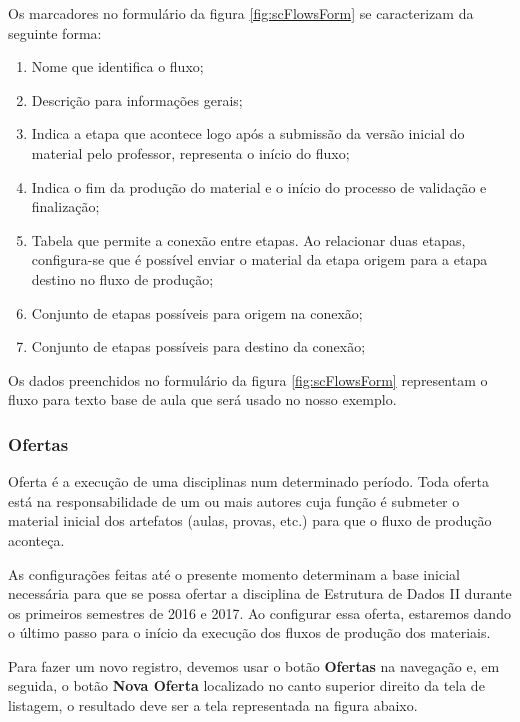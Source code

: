 Os marcadores no formulário da figura \hyperref[fig:scFlowsForm]{\ref{fig:scFlowsForm}} se caracterizam da seguinte forma:

\begin{enumerate}
	\item Nome que identifica o fluxo;
	\item Descrição para informações gerais;
	\item Indica a etapa que acontece logo após a submissão da versão inicial do material pelo professor, representa o início do fluxo;
	\item Indica o fim da produção do material e o início do processo de validação e finalização;
	\item Tabela que permite a conexão entre etapas. Ao relacionar duas etapas, configura-se que é possível enviar o material da etapa origem para a etapa destino no fluxo de produção;
	\item Conjunto de etapas possíveis para origem na conexão;
	\item Conjunto de etapas possíveis para destino da conexão;
\end{enumerate}

Os dados preenchidos no formulário da figura \hyperref[fig:scFlowsForm]{\ref{fig:scFlowsForm}} representam o fluxo para texto base de aula que será usado no nosso exemplo.

\subsubsection{Ofertas}

Oferta é a execução de uma disciplinas num determinado período. Toda oferta está na responsabilidade de um ou mais autores cuja função é submeter o material inicial dos artefatos (aulas, provas, etc.) para que o fluxo de  produção aconteça.

As configurações feitas até o presente momento determinam a base inicial necessária para que se possa ofertar a disciplina de Estrutura de Dados II durante os primeiros semestres de 2016 e 2017. Ao configurar essa oferta, estaremos dando o último passo para o início da execução dos fluxos de produção dos materiais.

Para fazer um novo registro, devemos usar o botão \textbf{Ofertas} na navegação e, em seguida, o botão \textbf{Nova Oferta} localizado no canto superior direito da tela de listagem, o resultado deve ser a tela representada na figura abaixo.

